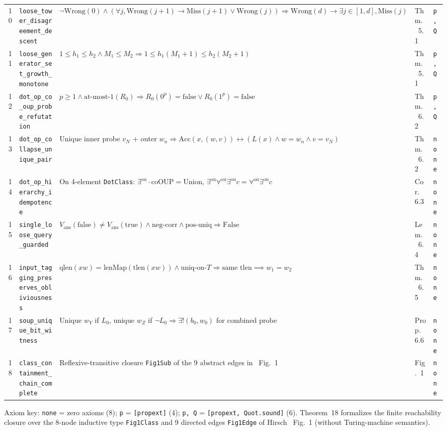 \documentclass[10pt,twocolumn]{article}
\begin{document}
\begin{table}[t]
{\begin{tabular}{@{}rllll@{}}
10 & \texttt{loose\_tower\_disagreement\_descent} & $\neg\mathrm{Wrong}(0) \land (\forall j,\mathrm{Wrong}(j{+}1)\to \mathrm{Miss}(j{+}1)\lor \mathrm{Wrong}(j)) \Rightarrow \mathrm{Wrong}(d)\to \exists j\in[1,d],\mathrm{Miss}(j)$ & Thm.~5.1 & \texttt{p, Q} \\
11 & \texttt{loose\_generator\_set\_growth\_monotone} & $1\le h_1\le h_2 \land M_1\le M_2 \Rightarrow 1\le h_1(M_1+1)\le h_2(M_2+1)$ & Thm.~5.1 & \texttt{p, Q} \\
12 & \texttt{dot\_op\_co\_oup\_probe\_refutation} & $p\ge 1 \land \text{at-most-1}(R_0) \Rightarrow R_0(0^p)=\mathrm{false} \lor R_0(1^p)=\mathrm{false}$ & Thm.~6.2 & \texttt{p, Q} \\
13 & \texttt{dot\_op\_collapse\_unique\_pair} & Unique inner probe $v_N$ + outer $w_n \Rightarrow \mathrm{Acc}(x,(w,v)) \leftrightarrow (L(x)\land w{=}w_n\land v{=}v_N)$ & Thm.~6.2 & \texttt{none} \\
14 & \texttt{dot\_op\_hierarchy\_idempotence} & On 4-element \texttt{DotClass}: $\exists^{\mathrm{ou}}\!\cdot\!\mathrm{coOUP}=\mathrm{Union}$, $\exists^{\mathrm{ou}}\forall^{\mathrm{ou}}\exists^{\mathrm{ou}} c = \forall^{\mathrm{ou}}\exists^{\mathrm{ou}} c$ & Cor.~6.3 & \texttt{none} \\
15 & \texttt{single\_loose\_query\_guarded} & $V_{\mathrm{ans}}(\mathrm{false})\neq V_{\mathrm{ans}}(\mathrm{true}) \land \text{neg-corr} \land \text{pos-uniq} \Rightarrow \mathrm{False}$ & Lem.~6.4 & \texttt{none} \\
16 & \texttt{input\_tagging\_preserves\_obliviousness} & $\mathrm{qlen}(xw)=\mathrm{lenMap}(\mathrm{tlen}(xw)) \land \text{uniq-on-}T \Rightarrow \text{same }\mathrm{tlen} \implies w_1=w_2$ & Thm.~6.5 & \texttt{none} \\
17 & \texttt{soup\_unique\_bit\_witness} & Unique $w_Y$ if $L_0$, unique $w_Z$ if $\neg L_0 \Rightarrow \exists!(b_0,w_0)$ for combined probe & Prop.~6.6 & \texttt{none} \\
18 & \texttt{class\_containment\_chain\_complete} & Reflexive-transitive closure \texttt{Fig1Sub} of the 9 abstract edges in~\cite{hirsch2026note} Fig.~1 & Fig.~1~\cite{hirsch2026note} & \texttt{none} \\
\bottomrule
\end{tabular}}
\vspace{-0.3em}
\begin{flushleft}
\tiny Axiom key: \texttt{none} = zero axioms (8); \texttt{p} = \texttt{[propext]} (4); \texttt{p, Q} = \texttt{[propext, Quot.sound]} (6). Theorem~18 formalizes the finite reachability closure over the 8-node inductive type \texttt{Fig1Class} and 9 directed edges \texttt{Fig1Edge} of Hirsch~\cite{hirsch2026note} Fig.~1 (without Turing-machine semantics).
\end{flushleft}
\vspace{-0.6em}
\end{table}
\end{document}
